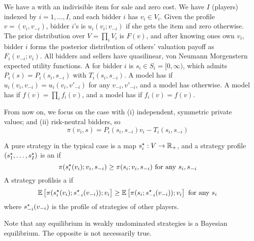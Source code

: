 \documentclass[10pt]{article}
\begin{document}
\begin{definition}
	We have a  with an indivisible item for sale and zero cost. We have $I$  (players) indexed by $i = 1,\dots,I$, and each bidder $i$ has  $v_i \in V_i$. Given the profile $v = (v_i,v_{-i})$, bidder $i$'s  is $u_i(v_i;v_{-i})$ if she gets the item and zero otherwise. The prior distribution over $V = \prod_i V_i$ is $F(v)$, and after knowing ones own $v_i$, bidder $i$ forms the posterior distribution of others' valuation payoff as $F_i(v_{-i};v_i)$. All bidders and sellers have quasilinear, von Neumann Morgenstern expected utility functions. A  for bidder $i$ is $s_i \in S_i = [0,\infty)$, which admits  $P_i(s) = P_i(s_i,s_{-i})$ with  $T_i(s_i,s_{-i})$. A model has  if $u_i(v_i,v_{-i}) = u_i(v_i,v'_{-i})$ for any $v_{-i}, v'_{-i}$, and a model has  otherwise. A model has  if $f(v) = \prod_i f_i(v)$, and a model has  if $f_i(v) = f(v)$.
\end{definition}

\begin{remark}
	From now on, we focus on the case with (i) independent, symmetric private values; and (ii) risk-neutral bidders, so \[\pi(v_i,s) = P_i(s_i,s_{-i})v_i - T_i(s_i,s_{-i})\]
\end{remark}

\begin{definition}
	A pure strategy in the typical case is a map $s_i^\star : V \to \mathbb{R}_+$, and a strategy profile $(s_1^\star,\dots,s_I^\star)$ is an  if \[\pi(s_i^\star(v_i);v_i,s_{-i}) \ge \pi(s_i;v_i,s_{-i}) \text{ for any } s_i,s_{-i}\]A strategy profilsis a  if \[\mathbb{E}\left[ \pi(s_i^\star(v_i);s^\star_{-i}(v_{-i})); v_i\right] \ge \mathbb{E} \left[ \pi(s_i;s^\star_{-i}(v_{-i}));v_i\right] \text{ for any } s_i\]where $s_{-i}^\star(v_{-i})$ is the profile of strategies of other players.
\end{definition}

\begin{remark}
	Note that any equilibrium in weakly undominated strategies is a Bayesian equilibrium. The opposite is not necessarily true. 
\end{remark}
\end{document}
